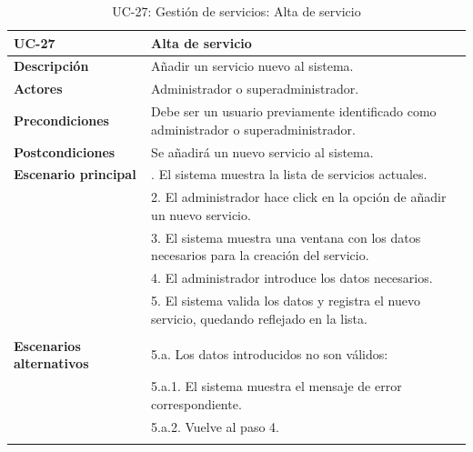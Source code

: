 \begin{table}
  \begin{center}
    \begin{tabularx}{16.4cm}{|l|X|}
      \hline
      \textbf{UC-27} & \textbf{Alta de servicio}\\
      \hline
      \textbf{Descripción} & Añadir un servicio nuevo al sistema.\\
      \hline
      \textbf{Actores} & Administrador o superadministrador.\\
      \hline
      \textbf{Precondiciones} & Debe ser un usuario previamente identificado como administrador o superadministrador.\\
      \hline
      \textbf{Postcondiciones} & Se añadirá un nuevo servicio al sistema.\\
      \hline
      \textbf{Escenario principal} & \smallskip 1. El sistema muestra la lista de servicios actuales.\\
      & 2. El administrador hace click en la opción de añadir un nuevo servicio.\\
      & 3. El sistema muestra una ventana con los datos necesarios para la creación del servicio.\\
      & 4. El administrador introduce los datos necesarios.\\
      & 5. El sistema valida los datos y registra el nuevo servicio, quedando reflejado en la lista.\\
      & \\
      \hline
      \textbf{Escenarios alternativos} & \smallskip 5.a. Los datos introducidos no son válidos:\\
      & \hspace{0.3cm} 5.a.1. El sistema muestra el mensaje de error correspondiente.\\
      & \hspace{0.3cm} 5.a.2. Vuelve al paso 4.\\
      & \\
      \hline
    \end{tabularx}
    \caption{UC-27: Gestión de servicios: Alta de servicio}
    \label{tab:CU-alta-servicio}
  \end{center}
\end{table}




